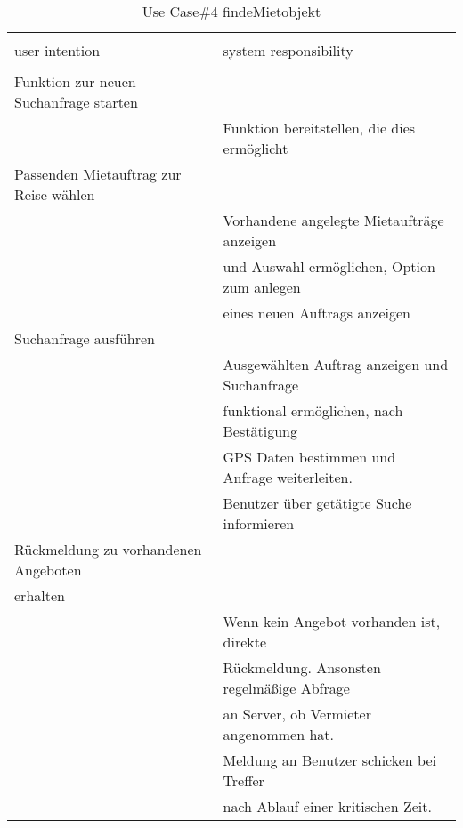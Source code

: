 \begin{table}[H]
\caption{Use Case\#4 findeMietobjekt }
\centering
\begin{tabular}{l l}
\\ [-0.5ex]

\hline\hline
\\ [-0.5ex]
user intention & system responsibility
\\ [1.5ex]
\hline
\\ [-0.5ex]
Funktion zur neuen Suchanfrage starten 	& 											 	\\[1ex]
										& Funktion bereitstellen, die dies ermöglicht	\\[1ex]
Passenden Mietauftrag zur Reise wählen	& 												\\[1ex]
										& Vorhandene angelegte Mietaufträge anzeigen	\\[1ex]
										& und Auswahl ermöglichen, Option zum anlegen   \\[1ex]
										& eines neuen Auftrags anzeigen					\\[1ex]
Suchanfrage ausführen 					& 												\\[1ex] 
										& Ausgewählten Auftrag anzeigen	und Suchanfrage	\\[1ex]
										& funktional ermöglichen, nach Bestätigung 		\\[1ex]
										& GPS Daten bestimmen und Anfrage weiterleiten.	\\[1ex]
										& Benutzer über getätigte Suche informieren		\\[1ex]
Rückmeldung zu vorhandenen Angeboten	& 												\\[1ex]
erhalten								& 												\\[1ex]
										& Wenn kein Angebot vorhanden ist, direkte		\\[1ex]
										& Rückmeldung. Ansonsten regelmäßige Abfrage 	\\[1ex]
										& an Server, ob Vermieter angenommen hat.		\\[1ex]
										& Meldung an Benutzer schicken bei Treffer 		\\[1ex]
										& nach Ablauf einer kritischen Zeit.				\\[1ex]
\hline
\end{tabular}
\label{tab:mietobjektUC}
\end{table}

